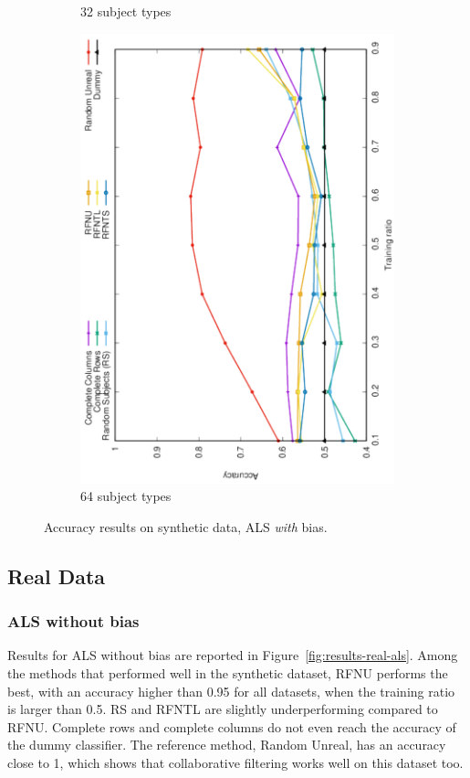 \documentclass[10pt, conference, compsocconf]{IEEEtran}
\newcommand{\todo}[1]{\marginpar{\parbox{18mm}{\flushleft\tiny\color{red}\textbf{TODO}:
      #1}}}
\begin{document}
\begin{figure}
\begin{subfigure}[b]{0.4\linewidth}
        \caption{32 subject types}
\end{subfigure}
\hfill
\begin{subfigure}[b]{0.4\linewidth}
        \includegraphics[width=0.8\columnwidth, angle=-90]{data/results/means_of_results/ALS-Bias/Synthetic/synthetic_subject_types/ALS-Bias-64-types.pdf}
        \caption{64 subject types}
\end{subfigure}
\caption{Accuracy results on synthetic data, ALS \emph{with} bias.}
\label{fig:results-synthetic-als-bias}
\end{figure}

\subsection{Real Data}

\subsubsection{ALS without bias}

Results for ALS without bias are reported in 
Figure~\ref{fig:results-real-als}. Among the methods that performed 
well in the synthetic dataset, RFNU performs the best, with an accuracy
higher than 0.95 \todo{check value} for all datasets, when the training ratio is larger than 0.5. RS and RFNTL
are slightly underperforming compared to RFNU.
Complete rows and complete columns do not even reach the accuracy of the 
dummy classifier. The reference method, Random Unreal, has an accuracy close
to 1, which shows that collaborative filtering works well on this dataset too.
\end{document}
